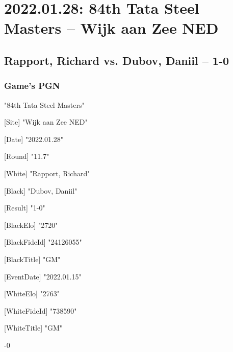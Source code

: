 \documentclass[9pt]{extarticle}
\begin{document}
\section*{2022.01.28: 84th Tata Steel Masters -- Wijk aan Zee NED}

\subsection*{Rapport, Richard vs. Dubov, Daniil -- 1-0}
\subsubsection*{Game's PGN}
\begin{flushleft}
[Event] "84th Tata Steel Masters"

[Site] "Wijk aan Zee NED"

[Date] "2022.01.28"

[Round] "11.7"

[White] "Rapport, Richard"

[Black] "Dubov, Daniil"

[Result] "1-0"

[BlackElo] "2720"

[BlackFideId] "24126055"

[BlackTitle] "GM"

[EventDate] "2022.01.15"

[WhiteElo] "2763"

[WhiteFideId] "738590"

[WhiteTitle] "GM"

\end{flushleft}
\begin{flushleft}
 \quad  {}-0
\end{flushleft}
\parindent 0mm
\end{document}
